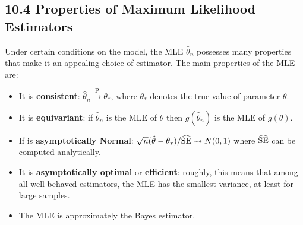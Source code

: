 \subsection*{10.4 Properties of Maximum Likelihood
Estimators}\label{properties-of-maximum-likelihood-estimators}
Under certain conditions on the model, the MLE \(\hat{\theta}_{n}\)
possesses many properties that make it an appealing choice of estimator.
The main properties of the MLE are:
\begin{itemize}[tightlist]
\item
  It is \textbf{consistent}:
  \(\hat{\theta}_{n} \xrightarrow{\textrm{P}} \theta_{*}\), where \(\theta_{*}\)
  denotes the true value of parameter \(\theta\).
\item
  It is \textbf{equivariant}: if \(\hat{\theta}_{n}\) is the MLE of
  \(\theta\) then \(g(\hat{\theta}_{n})\) is the MLE of \(g(\theta)\).
\item
  If is \textbf{asymptotically Normal}:
  \(\sqrt{n}(\hat{\theta} - \theta_{*}) / \widehat{\operatorname{\mathrm{SE}}} \leadsto N(0, 1)\)
  where \(\widehat{\operatorname{\mathrm{SE}}}\) can be computed analytically.
\item
  It is \textbf{asymptotically optimal} or \textbf{efficient}: roughly,
  this means that among all well behaved estimators, the MLE has the
  smallest variance, at least for large samples.
\item
  The MLE is approximately the Bayes estimator.
\end{itemize}

